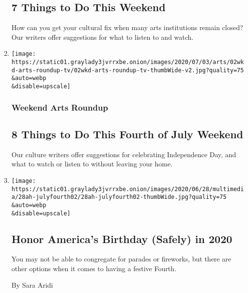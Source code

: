 \begin{enumerate}
  \hypertarget{7-things-to-do-this-weekend-1}{%
  \subsection{7 Things to Do This
  Weekend}\label{7-things-to-do-this-weekend-1}}

  How can you get your cultural fix when many arts institutions remain
  closed? Our writers offer suggestions for what to listen to and watch.
\item
  \href{/2020/07/02/arts/things-to-do-weekend-fourth-of-july-coronavirus.html}{}

  \texttt{[image: https://static01.graylady3jvrrxbe.onion/images/2020/07/03/arts/02wkd-arts-roundup-tv/02wkd-arts-roundup-tv-thumbWide-v2.jpg?quality=75\\\&auto=webp\\\&disable=upscale]}

  \hypertarget{weekend-arts-roundup}{%
  \subsubsection{Weekend Arts Roundup}\label{weekend-arts-roundup}}

  \hypertarget{8-things-to-do-this-fourth-of-july-weekend}{%
  \subsection{8 Things to Do This Fourth of July
  Weekend}\label{8-things-to-do-this-fourth-of-july-weekend}}

  Our culture writers offer suggestions for celebrating Independence
  Day, and what to watch or listen to without leaving your home.
\item
  \href{/2020/06/26/at-home/celebrate-fourth-of-july-coronavirus.html}{}

  \texttt{[image: https://static01.graylady3jvrrxbe.onion/images/2020/06/28/multimedia/28ah-julyfourth02/28ah-julyfourth02-thumbWide.jpg?quality=75\\\&auto=webp\\\&disable=upscale]}

  \hypertarget{honor-americas-birthday-safely-in-2020}{%
  \subsection{Honor America's Birthday (Safely) in
  2020}\label{honor-americas-birthday-safely-in-2020}}

  You may not be able to congregate for parades or fireworks, but there
  are other options when it comes to having a festive Fourth.

  By Sara Aridi
\end{enumerate}

